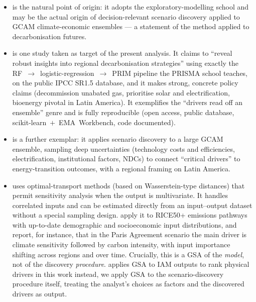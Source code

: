 \documentclass[sn-basic]{sn-jnl}%
\begin{document}
\begin{itemize}
     
\item \cite{Lamontagne_Reed_Link_Calvin_Clarke_Edmonds_2018} is the
natural point of origin: it adopts the exploratory-modelling school and may be
the actual origin of decision-relevant scenario discovery applied to GCAM
climate-economic ensembles --- a statement of the method applied to
decarbonisation futures.

\item \cite{Li_Pye_Keppo_Jaxa-Rozen_Trutnevyte_2023} is one study taken as target of the present analysis. It claims to ``reveal robust insights into regional decarbonisation
strategies'' using exactly the RF~$\rightarrow$~logistic-regression~$\rightarrow$~PRIM
pipeline the PRISMA school teaches, on the public IPCC SR1.5 database, and it
makes strong, concrete policy claims (decommission unabated gas, prioritise
solar and electrification, bioenergy pivotal in Latin America). It exemplifies
the ``drivers read off an ensemble'' genre and is fully reproducible (open
access, public database, scikit-learn~$+$~EMA~Workbench, code documented).
\item \cite{Wessel_Iyer_Wild_Ou_McJeon_Lamontagne_2024} is a further
exemplar: it applies scenario discovery to a large GCAM ensemble, sampling
deep uncertainties (technology costs and efficiencies, electrification,
institutional factors, NDCs) to connect ``critical drivers'' to
energy-transition outcomes, with a regional framing on Latin America.


\item \cite{Chiani_Borgonovo_Plischke_Tavoni_2025} uses optimal-transport methods (based on Wasserstein-type distances)
that permit
sensitivity analysis when the output is multivariate. It handles
correlated inputs and can be estimated directly from an input--output dataset
without a special sampling design. \cite{Chiani_Borgonovo_Plischke_Tavoni_2025} apply it to RICE50+ emissions pathways
with up-to-date demographic and socioeconomic input distributions, and report,
for instance, that in the Paris Agreement scenario the main driver is climate
sensitivity followed by carbon intensity, with input importance shifting
across regions and over time. Crucially, this is a GSA of the
\emph{model}, not of the discovery \emph{procedure}. 
\cite{Chiani_Borgonovo_Plischke_Tavoni_2025} applies GSA to IAM outputs to rank physical drivers
in this work instead, we apply GSA to the
scenario-discovery procedure itself, treating the analyst's choices as factors
and the discovered drivers as output.

\end{itemize}
\end{document}
